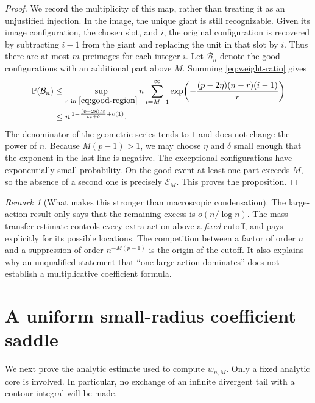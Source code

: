 \documentclass[11pt,a4paper]{article}
\numberwithin{equation}{section}
\theoremstyle{definition}
\theoremstyle{remark}
\newtheorem{remark}[theorem]{Remark}
\newcommand{\Prob}{\mathbb P}\newcommand{\E}{\mathbb E}
\newcommand{\One}{\mathcal E_M}
\begin{document}
\begin{proof}
We record the multiplicity of this map, rather than treating it as an
unjustified injection. In the image, the unique giant is still recognizable.
Given its image configuration, the chosen slot, and $i$, the original
configuration is recovered by subtracting $i-1$ from the giant and replacing
the unit in that slot by $i$. Thus there are at most $m$ preimages for each
integer $i$. Let $\mathcal B_n$ denote the good configurations with an
additional part above $M$. Summing \eqref{eq:weight-ratio} gives
\begin{align}
 \Prob(\mathcal B_n)
 &\le \sup_{r\text{ in }\eqref{eq:good-region}}
 n\sum_{i=M+1}^{\infty}
  \exp\!\left(-\frac{(p-2\eta)(n-r)(i-1)}r\right)\notag\\
 &\le n^{\,1-\frac{(p-2\eta)M}{c_*+\delta}+o(1)}.
 \label{eq:small-tail-bound}
\end{align}
The denominator of the geometric series tends to $1$ and does not change
the power of $n$. Because $M(p-1)>1$, we may choose $\eta$ and $\delta$
small enough that the exponent in the last line is negative.
The exceptional configurations have exponentially small probability.
On the good event at least one part exceeds $M$, so the absence of a second
one is precisely $\One$. This proves the proposition.
\end{proof}

\begin{remark}[What makes this stronger than macroscopic condensation]
The large-action result only says that the remaining excess is $o(n/\log n)$.
The mass-transfer estimate controls every extra action above a \emph{fixed}
cutoff, and pays explicitly for its possible locations. The competition
between a factor of order $n$ and a suppression of order
$n^{-M(p-1)}$ is the origin of the cutoff. It also explains why an
unqualified statement that ``one large action dominates'' does not establish
a multiplicative coefficient formula.
\end{remark}

\section{A uniform small-radius coefficient saddle}
\label{sec:inner-saddle}

We next prove the analytic estimate used to compute $w_{n,M}$.
Only a fixed analytic core is involved. In particular, no exchange of an
infinite divergent tail with a contour integral will be made.
\end{document}
